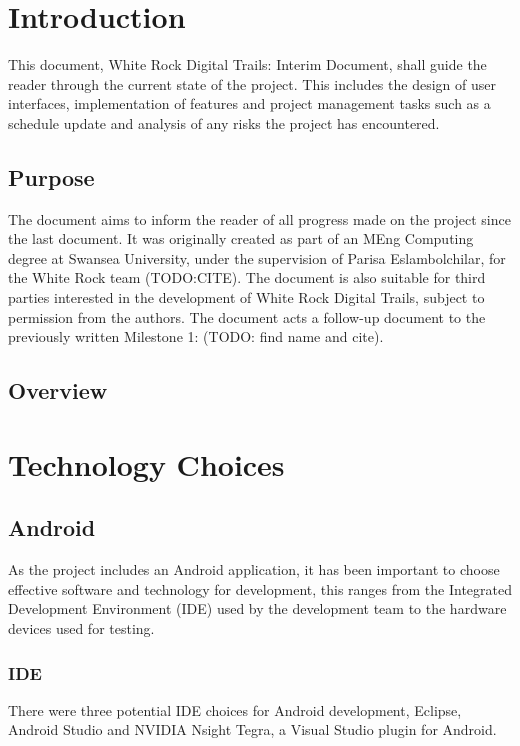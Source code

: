 \documentclass[11pt,a4paper]{article}
\begin{document}


\newpage 
\setcounter{page}{1}
\tableofcontents

\newpage
\setcounter{page}{1}
\section{Introduction}
This document, White Rock Digital Trails: Interim Document, shall guide the reader through the current state of the project. This includes the design of user interfaces, implementation of features and project management tasks such as a schedule update and analysis of any risks the project has encountered.
\subsection{Purpose}
The document aims to inform the reader of all progress made on the project since the last document. It was originally created as part of an MEng Computing degree at Swansea University, under the supervision of Parisa Eslambolchilar, for the White Rock team (TODO:CITE). The document is also suitable for third parties interested in the development of White Rock Digital Trails, subject to permission from the authors. The document acts a follow-up document to the previously written Milestone 1: (TODO: find name and cite).
\subsection{Overview}

\section{Technology Choices}
\subsection{Android}
As the project includes an Android application, it has been important to choose effective software and technology for development, this ranges from the Integrated Development Environment (IDE) used by the development team to the hardware devices used for testing.

\subsubsection{IDE}
There were three potential IDE choices for Android development, Eclipse, Android Studio and NVIDIA Nsight Tegra, a Visual Studio plugin for Android.
\end{document}
